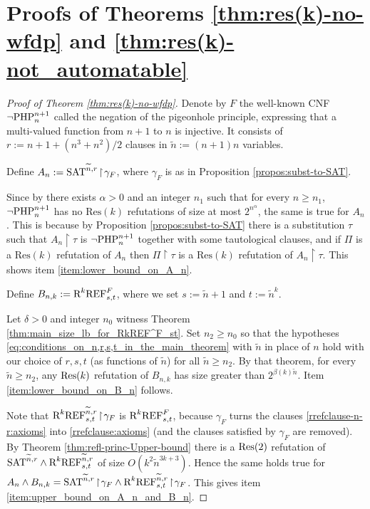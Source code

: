 \documentclass[10pt,a4paper]{article}
\theoremstyle{remark}
\newtheorem*{switching lemma}{Switching Lemma}
\newtheorem*{open problem}{Open Problem}
\theoremstyle{definition}
\begin{document}
\section{Proofs of Theorems \ref{thm:res(k)-no-wfdp}
 and \ref{thm:res(k)-not_automatable}}

\begin{proof}[Proof of Theorem \ref{thm:res(k)-no-wfdp}]
Denote by $F$ the well-known CNF $\neg \textnormal{PHP}^{n+1}_n$ called the negation of the pigeonhole principle, expressing that a multi-valued function from $n+1$ to $n$ is injective. It consists of $r := n+1+ (n^3+n^2)/2$ clauses in $\widetilde{n} := (n+1)n$ variables. 

Define $A_n := \textnormal{SAT}^{\widetilde{n},r} \! \restriction \! \gamma_F$, where $\gamma_F$ is as in Proposition \ref{propos:subst-to-SAT}. 

Since by \cite{Krajicek-Pudlak-Woods1995, Pitassi-Beame-Impagliazzo1993} there exists $\alpha > 0$ and an integer $n_1$ such that for every $n \geq n_1$, $\neg \textnormal{PHP}^{n+1}_n$ has no $\text{Res}(k)$ refutations of size at most $2^{n^{\alpha}}$, the same is true for $A_n$. This is because by Proposition \ref{propos:subst-to-SAT} there is a substitution $\tau$ such that $A_n \! \restriction \! \tau$ is $\neg \textnormal{PHP}^{n+1}_n$ together with some tautological clauses, and if $\Pi$ is a $\text{Res}(k)$ refutation of $A_n$ then $\Pi \! \restriction \! \tau$ is a $\text{Res}(k)$ refutation of $A_n \! \restriction \! \tau$. This shows item \ref{item:lower_bound_on_A_n}.

Define $B_{n,k} := \textnormal{R}^k\textnormal{REF}^{F}_{s,t}$, where we set $s := \widetilde{n} +1$ and $t := \widetilde{n}^k$.

Let $\delta > 0$ and integer $n_0$ witness Theorem \ref{thm:main_size_lb_for_RkREF^F_st}. Set $n_2 \geq n_0$ so that the hypotheses \eqref{eq:conditions_on_n,r,s,t_in_the_main_theorem} with $\widetilde{n}$ in place of $n$ hold with our choice of $r,s,t$ (as functions of $\widetilde{n}$) for all $\widetilde{n} \geq n_2$. 
By that theorem, for every $\widetilde{n} \geq n_2$, any $\textnormal{Res}(k)$ refutation of $B_{n,k}$ has size greater than $2^{\beta(k) \widetilde{n}}$. Item \ref{item:lower_bound_on_B_n} follows.

Note that $\textnormal{R}^k\textnormal{REF}^{\widetilde{n},r}_{s,t} \! \restriction \!  \gamma_F$ is $\textnormal{R}^k\textnormal{REF}^{F}_{s,t}$, because $\gamma_F$ turns the clauses \eqref{rrefclause-n-r:axioms} into \eqref{rrefclause:axioms} (and the clauses satisfied by $\gamma_F$ are removed). By Theorem \ref{thm:refl-princ-Upper-bound} there is a $\textnormal{Res}(2)$ refutation of $\textnormal{SAT}^{\widetilde{n},r} \land \textnormal{R}^k\textnormal{REF}^{\widetilde{n},r}_{s,t}$ of size $O(k^2 \widetilde{n}^{3k+3})$. Hence the same holds true for $A_n \land B_{n,k} = \textnormal{SAT}^{\widetilde{n},r} \! \restriction \! \gamma_F \land \textnormal{R}^k\textnormal{REF}^{\widetilde{n},r}_{s,t} \! \restriction \!  \gamma_F$. This gives item \ref{item:upper_bound_on_A_n_and_B_n}.
\end{proof}
\end{document}
